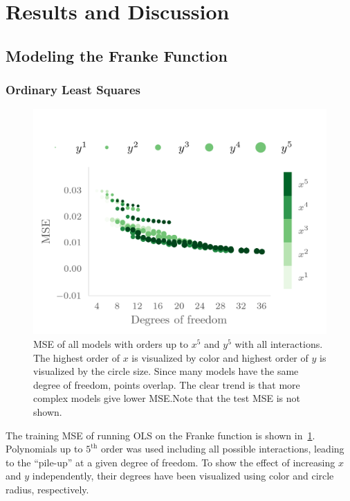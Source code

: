 \section{Results and Discussion}\label{sec:Discussion}

\subsection{Modeling the Franke Function}
\label{sec:model-franke-funct}

\subsubsection{Ordinary Least Squares}
\begin{figure}[]
  \centering
  \includegraphics[]{figures/ols_group.png}
  \caption{\label{fig:olscgrouped} MSE of all models with orders up to \(x^{5}\)
  and \(y^{5}\) with all interactions. The highest order of \(x\) is visualized
  by color and highest order of \(y\) is visualized by the circle size. Since many
  models have the same degree of freedom, points overlap. The clear trend is
  that more complex models give lower MSE.\@ Note that the test MSE is not shown.}
\end{figure}

The training MSE of running OLS on the Franke function is shown
in~\cref{fig:olscgrouped}. Polynomials up to \(5^{\text{th}}\) order was used including all possible
interactions, leading to the ``pile-up'' at a given degree of freedom. To show
the effect of increasing \(x\) and \(y\) independently, their degrees have been
visualized using color and circle radius, respectively.

